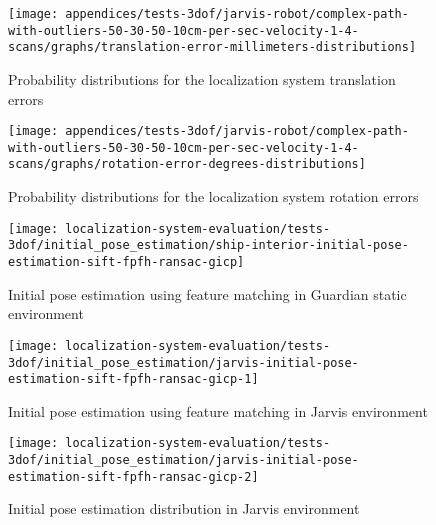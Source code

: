 \begin{figure}
	\centering
	\begin{minipage}[h]{0.497\textwidth}
		\centering
		\texttt{[image: appendices/tests-3dof/jarvis-robot/complex-path-with-outliers-50-30-50-10cm-per-sec-velocity-1-4-scans/graphs/translation-error-millimeters-distributions]}
		\caption{Probability distributions for the localization system translation errors}
		\label{fig:localization-system-evaluation_complex-path-with-outliers-50-30-50-10cm-per-sec-velocity-1-4-translation-error}
	\end{minipage}\hfill
	\begin{minipage}[h]{0.497\textwidth}
		\centering
		\texttt{[image: appendices/tests-3dof/jarvis-robot/complex-path-with-outliers-50-30-50-10cm-per-sec-velocity-1-4-scans/graphs/rotation-error-degrees-distributions]}
		\caption{Probability distributions for the localization system rotation errors}
		\label{fig:localization-system-evaluation_complex-path-with-outliers-50-30-50-10cm-per-sec-velocity-1-4-rotation-error}
	\end{minipage}
\end{figure}


\begin{figure}[H]
	\centering
	\texttt{[image: localization-system-evaluation/tests-3dof/initial\_pose\_estimation/ship-interior-initial-pose-estimation-sift-fpfh-ransac-gicp]}
	\caption{Initial pose estimation using feature matching in Guardian static environment}
	\label{fig:localization-system-evaluation_ship-interior-initial-pose-estimation-sift-fpfh-ransac-gicp}
\end{figure}

\begin{figure}[H]
	\centering
	\texttt{[image: localization-system-evaluation/tests-3dof/initial\_pose\_estimation/jarvis-initial-pose-estimation-sift-fpfh-ransac-gicp-1]}
	\caption{Initial pose estimation using feature matching in Jarvis environment}
	\label{fig:localization-system-evaluation_jarvis-initial-pose-estimation-sift-fpfh-ransac-gicp-1}
\end{figure}

\begin{figure}[H]
	\centering
	\texttt{[image: localization-system-evaluation/tests-3dof/initial\_pose\_estimation/jarvis-initial-pose-estimation-sift-fpfh-ransac-gicp-2]}
	\caption{Initial pose estimation distribution in Jarvis environment}
	\label{fig:localization-system-evaluation_jarvis-initial-pose-estimation-sift-fpfh-ransac-gicp-2}
\end{figure}




